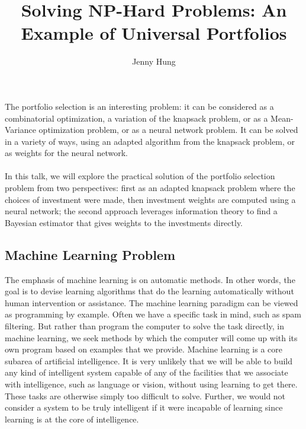 \documentclass{article}
\begin{document}
\title{Solving NP-Hard Problems: An Example of Universal Portfolios}
\author{Jenny Hung}
\maketitle


\paragraph{}
The portfolio selection is an interesting problem: it can be considered as a combinatorial optimization, a variation of the knapsack problem, or as a Mean-Variance optimization problem, or as a neural network problem. It can be solved in a variety of ways, using an adapted algorithm from the knapsack problem, or as weights for the neural network. 

\paragraph{}
In this talk, we will explore the practical solution of the portfolio selection problem from two perspectives: first as an adapted knapsack problem where the choices of investment were made, then investment weights are computed using a neural network; the second approach leverages information theory to find a Bayesian estimator that gives weights to the investments directly.  

\subsection*{Machine Learning Problem}
The emphasis of machine learning is on automatic methods. In other words, the goal is to devise learning algorithms that do the learning automatically without human intervention or assistance. The machine learning paradigm can be viewed as programming by example. Often we have a specific task in mind, such as spam filtering. But rather than program the computer to solve the task directly, in machine learning, we seek methods by which the computer will come up with its own program based on examples that we provide. Machine learning is a core subarea of artificial intelligence. It is very unlikely that we will be able to build any kind of intelligent system capable of any of the facilities that we associate with intelligence, such as language or vision, without using learning to get there. These tasks are otherwise simply too difficult to solve. Further, we would not consider a system to be truly intelligent if it were incapable of learning since learning is at the core of
intelligence. 
\end{document}
